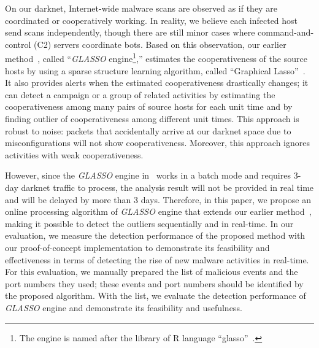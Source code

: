 \documentclass[conference]{IEEEtran}
\begin{document}
On our darknet, Internet-wide malware scans are observed as if they are coordinated or cooperatively working.
In reality, we believe each infected host send scans independently, though there are still minor cases where command-and-control (C2) servers coordinate bots.
Based on this observation, our earlier method~\cite{Han}, called ``{\it GLASSO} engine\footnote{The engine is named after the library of R language ``glasso''~\cite{Friedman_glasso}.},'' estimates the cooperativeness of the source hosts by using a sparse structure learning algorithm, called ``Graphical Lasso''~\cite{Friedman}.
It also provides alerts when the estimated cooperativeness drastically changes; it can detect a campaign or a group of related activities by estimating the cooperativeness among many pairs of source hosts for each unit time and by finding outlier of cooperativeness among different unit times.
This approach is robust to noise:  packets that accidentally arrive at our darknet space due to misconfigurations will not show cooperativeness.
Moreover, this approach ignores activities with weak cooperativeness.

However, since the {\it GLASSO} engine in~\cite{Han} works in a batch mode and requires 3-day darknet traffic to process, the analysis result will not be provided in real time and will be delayed by more than 3 days.
Therefore, in this paper, we propose an online processing algorithm of {\it GLASSO} engine that extends our earlier method~\cite{Han}, making it possible to detect the outliers sequentially and in real-time.
In our evaluation, we measure the detection performance of the proposed method with our proof-of-concept implementation to demonstrate its feasibility and effectiveness in terms of detecting the rise of new malware activities in real-time.
For this evaluation, we manually prepared the list of malicious events and the port numbers they used; these events and port numbers should be identified by the proposed algorithm.
With the list, we evaluate the detection performance of {\it GLASSO} engine and demonstrate its feasibility and usefulness.
\end{document}
